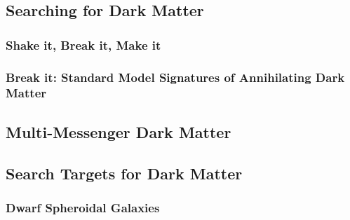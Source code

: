 \documentclass[a4paper, 12pt]{article}
\begin{document}
\subsection{Searching for Dark Matter\label{dm_search}}

\subsubsection{Shake it, Break it, Make it\label{sec:bop_it}}

\subsubsection{Break it: Standard Model Signatures of Annihilating Dark Matter\label{sec:break_it}}

\subsection{Multi-Messenger Dark Matter}

\subsection{Search Targets for Dark Matter\label{sec:dm_targets}}

\subsubsection{Dwarf Spheroidal Galaxies\label{sec:dSphs}}

\end{document}
